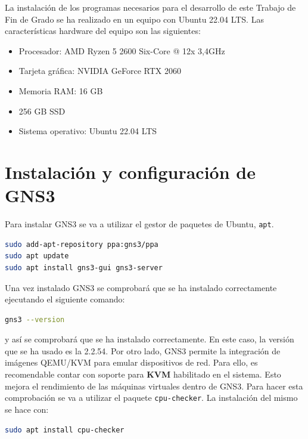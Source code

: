 La instalación de los programas necesarios para el desarrollo de este Trabajo de Fin de Grado se ha realizado en un equipo con Ubuntu 22.04 LTS. Las características hardware del equipo son las siguientes:

\begin{multicols}{2}
\begin{itemize}
    \item Procesador: AMD Ryzen 5 2600 Six-Core @ 12x 3,4GHz
    \item Tarjeta gráfica: NVIDIA GeForce RTX 2060
    \item Memoria RAM: 16 GB
    \item 256 GB SSD
    \item Sistema operativo: Ubuntu 22.04 LTS
\end{itemize}
\end{multicols}

\section{Instalación y configuración de GNS3}
\label{Apendice1:instalacion_gns3}
\noindent
Para instalar GNS3 se va a utilizar el gestor de paquetes de Ubuntu, \texttt{apt}.

\begin{lstlisting}[language=bash]
sudo add-apt-repository ppa:gns3/ppa
sudo apt update
sudo apt install gns3-gui gns3-server
\end{lstlisting}

\noindent
Una vez instalado GNS3 se comprobará que se ha instalado correctamente ejecutando el siguiente comando:

\begin{lstlisting}[language=bash]
gns3 --version
\end{lstlisting}

\noindent
y así se comprobará que se ha instalado correctamente. En este caso, la versión que se ha usado es la 2.2.54. Por otro lado, GNS3 permite la integración de imágenes QEMU/KVM para emular dispositivos de red. Para ello, es recomendable 
contar con soporte para \textbf{KVM} habilitado en el sistema. Esto mejora el rendimiento de las máquinas 
virtuales dentro de GNS3. Para hacer esta comprobación se va a utilizar el paquete \texttt{cpu-checker}. La 
instalación del mismo se hace con:

\begin{lstlisting}[language=bash]
sudo apt install cpu-checker
\end{lstlisting}

